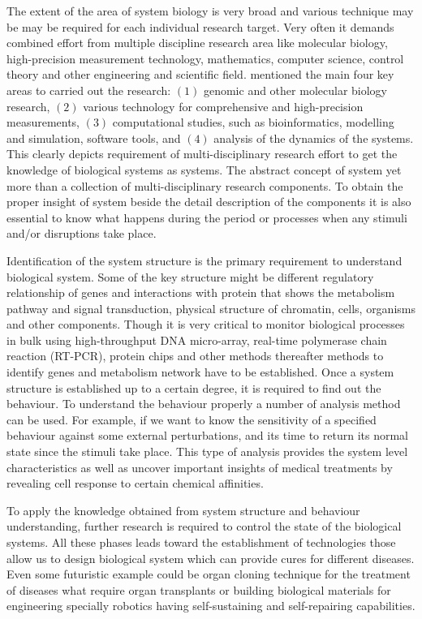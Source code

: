 The extent of the area of system biology is very broad and various technique may be may be required for each individual 
research target. Very often it demands combined effort from multiple discipline research area like molecular biology, 
high-precision measurement technology, mathematics, computer science, control theory and other engineering and 
scientific field. \cite{Kitano:2002} mentioned the main four key areas to carried out the research: $(1)$ genomic
and other molecular biology research, $(2)$ various technology for comprehensive and high-precision measurements,
$(3)$ computational studies, such as bioinformatics, modelling and simulation, software tools, and 
$(4)$ analysis of the dynamics of the systems. This clearly depicts requirement of multi-disciplinary research effort
to get the knowledge of biological systems as systems. The abstract concept of system yet more than a collection 
of multi-disciplinary research components. To obtain the proper insight of system beside the detail description of
the components it is also essential to know what happens during the period or processes when any stimuli and/or 
disruptions take place.

Identification of the system structure is the primary requirement to understand biological system. Some of the key 
structure might be different regulatory relationship of genes and interactions with protein that shows the metabolism
pathway and signal transduction, physical structure of chromatin, cells, organisms and other components. Though it is 
very critical to monitor biological processes in bulk using high-throughput DNA micro-array, real-time polymerase 
chain reaction (RT-PCR), protein chips and other methods thereafter methods to identify genes and metabolism network
have to be established. Once a system structure is established up to a certain degree, it is required to find out
the behaviour. To understand the behaviour properly a number of analysis method can be used. For example, if we want
to know the sensitivity of a specified behaviour against some external perturbations, and its time to return its
normal state since the stimuli take place. This type of analysis provides the system level characteristics as well as
uncover important insights of medical treatments by revealing cell response to certain chemical affinities. 

To apply the knowledge obtained from system structure and behaviour understanding, further research is required to 
control the state of the biological systems. All these phases leads toward the establishment of technologies those
allow us to design biological system which can provide cures for different diseases. Even some futuristic example
could be organ cloning technique for the treatment of diseases what require organ transplants or building 
biological materials for engineering specially robotics having self-sustaining and self-repairing capabilities.

